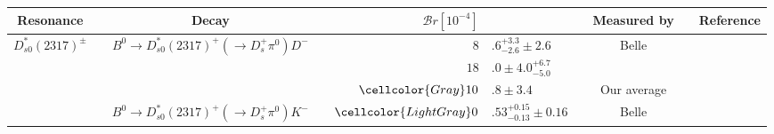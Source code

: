 {\setlength\tabcolsep{0pt}
	\begin{tabular}{cp{5pt}cp{5pt}r@{}lp{5pt}cp{5pt}c}
		\toprule
		\rowcolor{Gray} Resonance &   & Decay &   & \multicolumn{2}{c}{$\mathcal{B}r[10^{-4}]$} &   & \multicolumn{1}{c}{Measured by} &   & \multicolumn{1}{c}{Reference} \\ \midrule								
	\multirow{4}{*}[-5pt]{$D_{s0}^{*}(2317)^{\pm}$}	&&	\multirow{3}{*}{$B^{0}\to D_{s0}^{*}(2317)^{+}(\to D^{+}_{s}\pi^{0})D^{-}$}	&&$	8$&$.6^{+3.3}_{-2.6}\pm2.6	$&&	Belle	&&	\cite{Krokovny:2003zq}        \\
		&&		&&$	18$&$.0\pm 4.0{}^{+6.7}_{-5.0}	$&&	\babar{}	&&	\cite{Aubert:2004pw}          \\  \cmidrule{4-9}
		&&		&\cellcolor{Gray}&$	\cellcolor{Gray}10$&\cellcolor{Gray}$.8 \pm 3.4	$&\cellcolor{Gray}&	\cellcolor{Gray}  Our average	&\cellcolor{Gray}&	\\ \cmidrule{3-9}
		&&	\multirow{1}{*}{$B^{0}\to D_{s0}^{*}(2317)^{+}(\to D^{+}_{s}\pi^{0})K^{-}$}	&\cellcolor{LightGray} &$	\cellcolor{LightGray}  0$&\cellcolor{LightGray}$.53^{+0.15}_{-0.13}\pm0.16	$&\cellcolor{LightGray}&	\cellcolor{LightGray}  Belle	&\cellcolor{LightGray}&	\cite{Abe:2004wz}             \\ \midrule
									

\end{tabular}}
